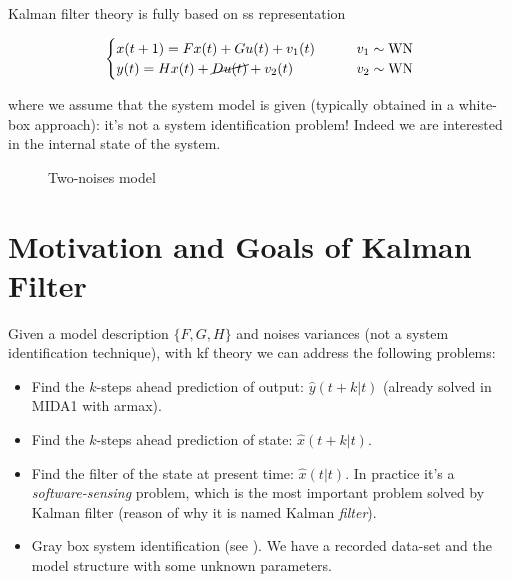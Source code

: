 Kalman filter theory is fully based on \acrfull{ss} representation

\[
    \begin{cases}
        x(t+1) = Fx(t) + Gu(t) + v_1(t)  & \qquad v_1 \sim \operatorname{WN} \\
        y(t) = Hx(t) + \cancel{Du(t)} + v_2(t) & \qquad v_2 \sim \operatorname{WN}
    \end{cases}
\]

where we assume that the system model is given (typically obtained in a white-box approach): it's not a system identification problem! Indeed we are interested in the internal state of the system.

\begin{figure}[H]
    \centering
    \caption*{Two-noises model}
\end{figure}


\section{Motivation and Goals of Kalman Filter}

Given a model description $\{F, G, H\}$ and noises variances (not a system identification technique), with \acrfull{kf} theory we can address the following problems:

\begin{itemize}
    \item Find the $k$-steps ahead prediction of output: $\hat{y}(t+k|t)$ (already solved in MIDA1 with \gls{armax}).
    \item Find the $k$-steps ahead prediction of state: $\hat{x}(t+k|t)$.
    \item Find the filter of the state at present time: $\hat{x}(t|t)$. In practice it's a \emph{software-sensing} problem, which is the most important problem solved by Kalman filter (reason of why it is named Kalman \emph{filter}).
    \item Gray box system identification (see ). We have a recorded data-set and the model structure with some unknown parameters.
\end{itemize}


